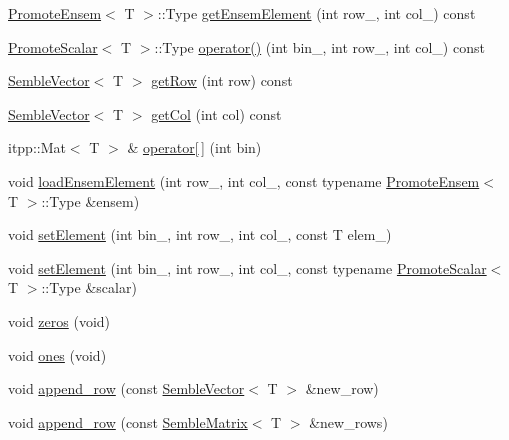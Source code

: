 \begin{DoxyCompactItemize}
\item 
\mbox{\hyperlink{structSEMBLE_1_1PromoteEnsem}{Promote\+Ensem}}$<$ T $>$\+::Type \mbox{\hyperlink{structSEMBLE_1_1SembleMatrix_a31078e328f597a99646b6f12caa01418}{get\+Ensem\+Element}} (int row\+\_\+, int col\+\_\+) const
\item 
\mbox{\hyperlink{structSEMBLE_1_1PromoteScalar}{Promote\+Scalar}}$<$ T $>$\+::Type \mbox{\hyperlink{structSEMBLE_1_1SembleMatrix_abebebe665ebbe033993dbc10e29c73e3}{operator()}} (int bin\+\_\+, int row\+\_\+, int col\+\_\+) const
\item 
\mbox{\hyperlink{structSEMBLE_1_1SembleVector}{Semble\+Vector}}$<$ T $>$ \mbox{\hyperlink{structSEMBLE_1_1SembleMatrix_aeee188c8f5e6f655d9d4ae52e8ff70b4}{get\+Row}} (int row) const
\item 
\mbox{\hyperlink{structSEMBLE_1_1SembleVector}{Semble\+Vector}}$<$ T $>$ \mbox{\hyperlink{structSEMBLE_1_1SembleMatrix_afaaa55df8ea1fc3e27b2100d5cc70d78}{get\+Col}} (int col) const
\item 
itpp\+::\+Mat$<$ T $>$ \& \mbox{\hyperlink{structSEMBLE_1_1SembleMatrix_a3118ba5b51d9bf99f0c33fc769bca336}{operator\mbox{[}$\,$\mbox{]}}} (int bin)
\item 
void \mbox{\hyperlink{structSEMBLE_1_1SembleMatrix_a84fd4f9ffc4012e6e09faa054ed57908}{load\+Ensem\+Element}} (int row\+\_\+, int col\+\_\+, const typename \mbox{\hyperlink{structSEMBLE_1_1PromoteEnsem}{Promote\+Ensem}}$<$ T $>$\+::Type \&ensem)
\item 
void \mbox{\hyperlink{structSEMBLE_1_1SembleMatrix_a1b68e0d33a0d6699d94590135e3f4163}{set\+Element}} (int bin\+\_\+, int row\+\_\+, int col\+\_\+, const T elem\+\_\+)
\item 
void \mbox{\hyperlink{structSEMBLE_1_1SembleMatrix_a5840aaaabbade4c2714f3bfd99d150a8}{set\+Element}} (int bin\+\_\+, int row\+\_\+, int col\+\_\+, const typename \mbox{\hyperlink{structSEMBLE_1_1PromoteScalar}{Promote\+Scalar}}$<$ T $>$\+::Type \&scalar)
\item 
void \mbox{\hyperlink{structSEMBLE_1_1SembleMatrix_a1b6d5a9a3816e9d98eb55a71a5fa1a5f}{zeros}} (void)
\item 
void \mbox{\hyperlink{structSEMBLE_1_1SembleMatrix_aef0a3843776f6b716f466616c10b1cd2}{ones}} (void)
\item 
void \mbox{\hyperlink{structSEMBLE_1_1SembleMatrix_a7553dc6264308f6f0755e46ed49c3df4}{append\+\_\+row}} (const \mbox{\hyperlink{structSEMBLE_1_1SembleVector}{Semble\+Vector}}$<$ T $>$ \&new\+\_\+row)
\item 
void \mbox{\hyperlink{structSEMBLE_1_1SembleMatrix_a823a02fc92f954965ca57bd5cbe72cfe}{append\+\_\+row}} (const \mbox{\hyperlink{structSEMBLE_1_1SembleMatrix}{Semble\+Matrix}}$<$ T $>$ \&new\+\_\+rows)

\end{DoxyCompactItemize}
